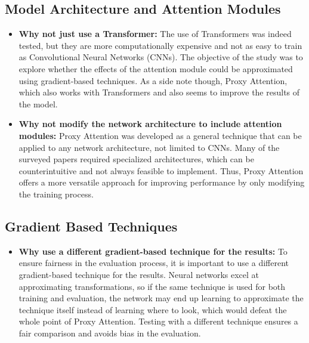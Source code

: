 \documentclass[a4paper,11pt,openright]{book}
\begin{document}
\subsection{Model Architecture and Attention Modules}
\begin{itemize}
    \item \textbf{Why not just use a Transformer: }The use of Transformers was indeed tested, but they are more computationally expensive and not as easy to train as Convolutional Neural Networks (CNNs). The objective of the study was to explore whether the effects of the attention module could be approximated using gradient-based techniques. As a side note though, Proxy Attention, which also works with Transformers and also seems to improve the results of the model.
    \item \textbf{Why not modify the network architecture to include attention modules: }Proxy Attention was developed as a general technique that can be applied to any network architecture, not limited to CNNs. Many of the surveyed papers required specialized architectures, which can be counterintuitive and not always feasible to implement. Thus, Proxy Attention offers a more versatile approach for improving performance by only modifying the training process.
\end{itemize}

\subsection{Gradient Based Techniques}
\begin{itemize}
    \item \textbf{Why use a different gradient-based technique for the results: } To ensure fairness in the evaluation process, it is important to use a different gradient-based technique for the results. Neural networks excel at approximating transformations, so if the same technique is used for both training and evaluation, the network may end up learning to approximate the technique itself instead of learning where to look, which would defeat the whole point of Proxy Attention. Testing with a different technique ensures a fair comparison and avoids bias in the evaluation.

\end{itemize}
\end{document}
